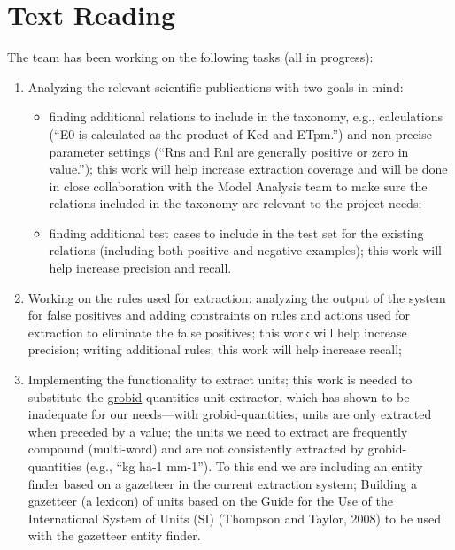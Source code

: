 \documentclass[article, 12pt, oneside]{memoir}
\begin{document}
\hypertarget{text-reading}{%
\section{Text Reading}\label{text-reading}}

The team has been working on the following tasks (all in progress):

\begin{enumerate}
\def\labelenumi{\arabic{enumi}.}
\tightlist
\item
  Analyzing the relevant scientific publications with two goals in mind:

  \begin{itemize}
  \tightlist
  \item
    finding additional relations to include in the taxonomy, e.g.,
    calculations (``E0 is calculated as the product of Kcd and ETpm.'')
    and non-precise parameter settings (``Rns and Rnl are generally
    positive or zero in value.''); this work will help increase
    extraction coverage and will be done in close collaboration with the
    Model Analysis team to make sure the relations included in the
    taxonomy are relevant to the project needs;
  \item
    finding additional test cases to include in the test set for the
    existing relations (including both positive and negative examples);
    this work will help increase precision and recall.
  \end{itemize}
\item
  Working on the rules used for extraction: analyzing the output of the
  system for false positives and adding constraints on rules and actions
  used for extraction to eliminate the false positives; this work will
  help increase precision; writing additional rules; this work will help
  increase recall;
\item
  Implementing the functionality to extract units; this work is needed
  to substitute the
  \href{https://github.com/kermitt2/grobid}{grobid}-quantities unit
  extractor, which has shown to be inadequate for our needs---with
  grobid-quantities, units are only extracted when preceded by a value;
  the units we need to extract are frequently compound (multi-word) and
  are not consistently extracted by grobid-quantities (e.g., ``kg ha-1
  mm-1''). To this end we are including an entity finder based on a
  gazetteer in the current extraction system; Building a gazetteer (a
  lexicon) of units based on the Guide for the Use of the International
  System of Units (SI) (Thompson and Taylor, 2008) to be used with the
  gazetteer entity finder.
\end{enumerate}
\end{document}
